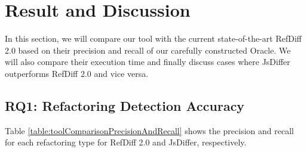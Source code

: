 \documentclass[letterpaper,12pt,onecolumn,final]{report}
\begin{document}
\section {Result and Discussion}

In this section, we will compare our tool with the current state-of-the-art RefDiff 2.0 based on their precision and recall of our carefully constructed Oracle. We will also compare their execution time and finally discuss cases where JsDiffer outperforms RefDiff 2.0 and vice versa.

\subsection{RQ1: Refactoring Detection Accuracy}

Table \ref{table:toolComparisonPrecisionAndRecall} shows the precision and recall for each refactoring type for RefDiff 2.0 and JsDiffer, respectively. 
\end{document}
